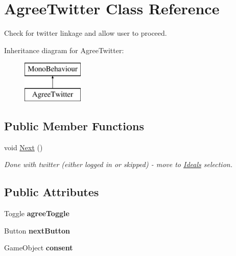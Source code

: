 \hypertarget{class_agree_twitter}{}\section{Agree\+Twitter Class Reference}
\label{class_agree_twitter}


Check for twitter linkage and allow user to proceed.  


Inheritance diagram for Agree\+Twitter\+:\begin{figure}[H]
\begin{center}
\leavevmode
\includegraphics[height=2.000000cm]{class_agree_twitter}
\end{center}
\end{figure}
\subsection*{Public Member Functions}
\begin{DoxyCompactItemize}
\item 
\mbox{\label{class_agree_twitter_abeb68444f8f36f2eace07d276ed9970c}} 
void \mbox{\hyperlink{class_agree_twitter_abeb68444f8f36f2eace07d276ed9970c}{Next}} ()
\begin{DoxyCompactList}\small\item\em Done with twitter (either logged in or skipped) -\/ move to \mbox{\hyperlink{class_ideals}{Ideals}} selection. \end{DoxyCompactList}\end{DoxyCompactItemize}
\subsection*{Public Attributes}
\begin{DoxyCompactItemize}
\item 
\mbox{\label{class_agree_twitter_a7fa22a914989a70cf52eb4a0a46cd0c1}} 
Toggle {\bfseries agree\+Toggle}
\item 
\mbox{\label{class_agree_twitter_ac75bd6520211bb529625d0972bc9f896}} 
Button {\bfseries next\+Button}
\item 
\mbox{\label{class_agree_twitter_a88d8132a44edc46d16598ac3cf431f94}} 
Game\+Object {\bfseries consent}
\end{DoxyCompactItemize}
